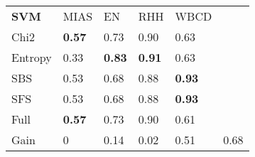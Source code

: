 \begin{tabular}{|l|l|l|l|l|l}
\cline{1-5}
        \textbf{SVM} & MIAS              & EN                & RHH               & WBCD      &         \\
\cline{1-5}
Chi2    & \textbf{0.57}  & 0.73           & 0.90           & 0.63           &         \\
Entropy & 0.33           & \textbf{0.83}  & \textbf{0.91}  & 0.63           &         \\
SBS     & 0.53           & 0.68           & 0.88           & \textbf{0.93}  &         \\
SFS     & 0.53           & 0.68           & 0.88           & \textbf{0.93}  &         \\
Full    & \textbf{0.57}  & 0.73           & 0.90           & 0.61           &         \\
\cline{1-5}
\cline{1-5}
Gain    & 0                 & 0.14           & 0.02           & 0.51           & 0.68 \\
\cline{1-5}
\end{tabular}

